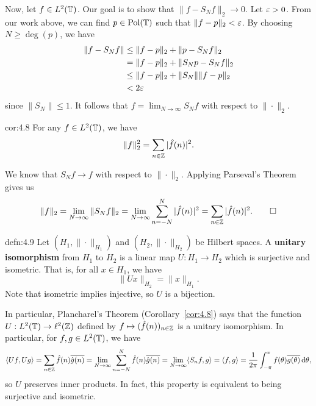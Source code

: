 \begin{pf}
    Now, let $f \in L^2(\mathbb{T})$. Our goal is to show that $\|f - S_Nf\|_2 \to 0$. 
    Let $\varepsilon > 0$. From our work above, we can find $p \in \operatorname{Pol}(\mathbb{T})$ 
    such that $\|f - p\|_2 < \varepsilon$. By choosing $N \geq \deg(p)$, we have 
    \begin{align*}
        \|f - S_Nf\| &\leq \|f - p\|_2 + \|p - S_Nf\|_2 \\ 
        &= \|f - p\|_2 + \|S_Np - S_Nf\|_2 \\ 
        &\leq \|f - p\|_2 + \|S_N\| \|f - p\|_2 \\ 
        &< 2\varepsilon 
    \end{align*}
    since $\|S_N\| \leq 1$. It follows that $f = \lim_{N\to\infty} S_Nf$ 
    with respect to $\|\cdot\|_2$. 
\end{pf}

\begin{cor}{cor:4.8}
    For any $f \in L^2(\mathbb{T})$, we have 
    \[ \|f\|_2^2 = \sum_{n\in\mathbb{Z}} |\hat f(n)|^2. \] 
\end{cor}
\begin{pf}
    We know that $S_Nf \to f$ with respect to $\|\cdot\|_2$. Applying 
    Parseval's Theorem gives us 
    \[ \|f\|_2 = \lim_{N\to\infty} \|S_N f\|_2 
    = \lim_{N\to\infty} \sum_{n=-N}^N |\hat f(n)|^2 = 
    \sum_{n\in\mathbb{Z}} |\hat f(n)|^2. \qedhere \] 
\end{pf}

\begin{defn}{defn:4.9}
    Let $(H_1, \|\cdot\|_{H_1})$ and $(H_2, \|\cdot\|_{H_2})$ be Hilbert 
    spaces. A {\bf unitary isomorphism} from $H_1$ to $H_2$ is a 
    linear map $U : H_1 \to H_2$ which is surjective and isometric. That is, 
    for all $x \in H_1$, we have 
    \[ \|Ux\|_{H_2} = \|x\|_{H_1}. \] 
    Note that isometric implies injective, so $U$ is a bijection. 
\end{defn}

In particular, Plancharel's Theorem (Corollary~\ref{cor:4.8}) says that 
the function $U : L^2(\mathbb{T}) \to \ell^2(\mathbb{Z})$ defined by $f \mapsto 
(\hat f(n))_{n\in\mathbb{Z}}$ is a unitary isomorphism. In particular, for 
$f, g \in L^2(\mathbb{T})$, we have 
\[ \langle Uf, Ug \rangle = \sum_{n\in\mathbb{Z}} \hat f(n) \overline{\hat g(n)} 
= \lim_{N\to\infty} \sum_{n=-N}^N \hat f(n) \overline{\hat g(n)} 
= \lim_{N\to\infty} \langle S_n f, g \rangle 
= \langle f, g \rangle 
= \frac{1}{2\pi} \int_{-\pi}^\pi f(\theta) \overline{g(\theta)} \,\mathrm{d}\theta, \] 
so $U$ preserves inner products. In fact, this property is equivalent to being 
surjective and isometric. 

